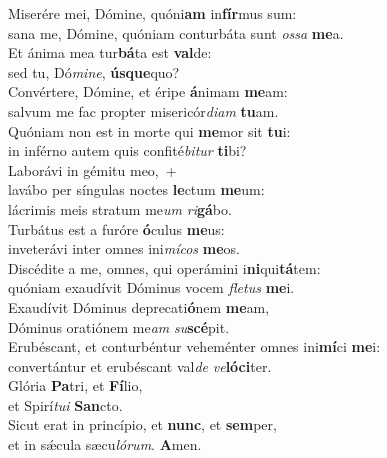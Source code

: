 \evenverse Miserére mei, Dómine, quóni\textbf{am} in\textbf{fír}mus sum:~\*\\
\evenverse sana me, Dómine, quóniam conturbáta sunt \textit{os}\textit{sa} \textbf{me}a.\\
\oddverse Et ánima mea tur\textbf{bá}ta est \textbf{val}de:~\*\\
\oddverse sed tu, Dó\textit{mi}\textit{ne}, \textbf{ús}\textbf{que}quo?\\
\evenverse Convértere, Dómine, et éripe \textbf{á}nimam \textbf{me}am:~\*\\
\evenverse salvum me fac propter misericór\textit{di}\textit{am} \textbf{tu}am.\\
\oddverse Quóniam non est in morte qui \textbf{me}mor sit \textbf{tu}i:~\*\\
\oddverse in inférno autem quis confité\textit{bi}\textit{tur} \textbf{ti}bi?\\
\evenverse Laborávi in gémitu meo,~+\\
\evenverse  lavábo per síngulas noctes \textbf{le}ctum \textbf{me}um:~\*\\
\evenverse lácrimis meis stratum me\textit{um} \textit{ri}\textbf{gá}bo.\\
\oddverse Turbátus est a furóre \textbf{ó}culus \textbf{me}us:~\*\\
\oddverse inveterávi inter omnes ini\textit{mí}\textit{cos} \textbf{me}os.\\
\evenverse Discédite a me, omnes, qui operámini i\textbf{ni}qui\textbf{tá}tem:~\*\\
\evenverse quóniam exaudívit Dóminus vocem \textit{fle}\textit{tus} \textbf{me}i.\\
\oddverse Exaudívit Dóminus deprecati\textbf{ó}nem \textbf{me}am,~\*\\
\oddverse Dóminus oratiónem me\textit{am} \textit{su}\textbf{scé}pit.\\
\evenverse Erubéscant, et conturbéntur veheménter omnes ini\textbf{mí}ci \textbf{me}i:~\*\\
\evenverse convertántur et erubéscant val\textit{de} \textit{ve}\textbf{ló}\textbf{ci}ter.\\
\oddverse Glória \textbf{Pa}tri, et \textbf{Fí}lio,~\*\\
\oddverse et Spirí\textit{tu}\textit{i} \textbf{San}cto.\\
\evenverse Sicut erat in princípio, et \textbf{nunc}, et \textbf{sem}per,~\*\\
\evenverse et in sǽcula sæcu\textit{ló}\textit{rum}. \textbf{A}men.\\
